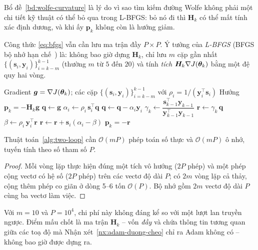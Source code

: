 Bổ đề~\ref{bd:wolfe-curvature} là lý do vì sao tìm kiếm đường Wolfe không phải
một chi tiết kỹ thuật có thể bỏ qua trong L-BFGS: bỏ nó đi thì $\bm{H}_k$ có thể
mất tính xác định dương, và khi ấy $\bm{p}_k$ không còn là hướng giảm.
 
Công thức \eqref{eq:bfgs} vẫn cần lưu ma trận đầy $P\times P$. Ý tưởng của
\emph{L-BFGS} (BFGS bộ nhớ hạn chế~\cite{liu1989}) là: không bao giờ dựng
$\bm{H}_k$, chỉ lưu $m$ cặp gần nhất
$\{(\bm{s}_i,\bm{y}_i)\}_{i=k-m}^{k-1}$ (thường $m$ từ $5$ đến $20$) và tính
\emph{tích} $\bm{H}_k\nabla J(\bm{\theta}_k)$ bằng một đệ quy hai vòng.
 
\begin{algorithm}[htbp]
\caption{Đệ quy hai vòng của L-BFGS}
\label{alg:two-loop}
\begin{algorithmic}[1]
\Require Gradient $\bm{g} = \nabla J(\bm{\theta}_k)$; các cặp
  $\{(\bm{s}_i,\bm{y}_i)\}_{i=k-m}^{k-1}$ với
  $\rho_i = 1/(\bm{y}_i^{\top}\bm{s}_i)$
\Ensure Hướng $\bm{p}_k = -\bm{H}_k \bm{g}$
\State $\bm{q} \gets \bm{g}$
  \State $\alpha_i \gets \rho_i\, \bm{s}_i^{\top}\bm{q}$
  \State $\bm{q} \gets \bm{q} - \alpha_i \bm{y}_i$
\EndFor
\State $\gamma_k \gets \dfrac{\bm{s}_{k-1}^{\top}\bm{y}_{k-1}}
  {\bm{y}_{k-1}^{\top}\bm{y}_{k-1}}$
\State $\bm{r} \gets \gamma_k\, \bm{q}$
  \State $\beta \gets \rho_i\, \bm{y}_i^{\top}\bm{r}$
  \State $\bm{r} \gets \bm{r} + \bm{s}_i\left(\alpha_i - \beta\right)$
\EndFor
\State \Return $\bm{p}_k = -\bm{r}$
\end{algorithmic}
\end{algorithm}
 
\begin{menhde}
\label{md:two-loop-cost}
Thuật toán~\ref{alg:two-loop} cần $\mathcal{O}(mP)$ phép toán số thực và
$\mathcal{O}(mP)$ ô nhớ, tuyến tính theo số tham số $P$.
\end{menhde}
 
\begin{proof}
Mỗi vòng lặp thực hiện đúng một tích vô hướng ($2P$ phép) và một phép cộng vectơ
có hệ số ($2P$ phép) trên các vectơ độ dài $P$; có $2m$ vòng lặp cả thảy, cộng
thêm phép co giãn ở dòng 5--6 tốn $\mathcal{O}(P)$. Bộ nhớ gồm $2m$ vectơ độ dài
$P$ cùng ba vectơ làm việc.
\end{proof}
 
Với $m = 10$ và $P = 10^4$, chi phí này không đáng kể so với một lượt lan truyền
ngược. Điểm mấu chốt là ma trận $\bm{H}_k$ -- vốn \emph{đầy} và chứa thông tin
tương quan giữa các toạ độ mà Nhận xét~\ref{nx:adam-duong-cheo} chỉ ra Adam
không có -- không bao giờ được dựng ra.
 
